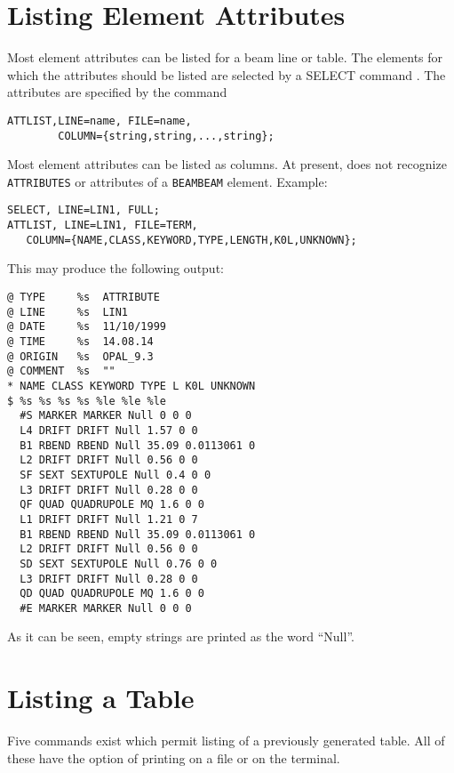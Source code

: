 \section{Listing Element Attributes}
\label{sec:attlist}
Most element attributes can be listed for a beam line or table.
The elements for which the attributes should be listed are selected
by a {SELECT} command .
The attributes are specified by the command
\begin{verbatim}
ATTLIST,LINE=name, FILE=name,
        COLUMN={string,string,...,string};
\end{verbatim}
Most element attributes can be listed as columns.
At present, \opal does not recognize \texttt{ATTRIBUTES} or attributes
of a \texttt{BEAMBEAM} element.
Example:
\begin{verbatim}
SELECT, LINE=LIN1, FULL;
ATTLIST, LINE=LIN1, FILE=TERM,
   COLUMN={NAME,CLASS,KEYWORD,TYPE,LENGTH,K0L,UNKNOWN};
\end{verbatim}
This may produce the following output:
\begin{verbatim}
@ TYPE     %s  ATTRIBUTE
@ LINE     %s  LIN1
@ DATE     %s  11/10/1999
@ TIME     %s  14.08.14
@ ORIGIN   %s  OPAL_9.3
@ COMMENT  %s  ""
* NAME CLASS KEYWORD TYPE L K0L UNKNOWN
$ %s %s %s %s %le %le %le
  #S MARKER MARKER Null 0 0 0
  L4 DRIFT DRIFT Null 1.57 0 0
  B1 RBEND RBEND Null 35.09 0.0113061 0
  L2 DRIFT DRIFT Null 0.56 0 0
  SF SEXT SEXTUPOLE Null 0.4 0 0
  L3 DRIFT DRIFT Null 0.28 0 0
  QF QUAD QUADRUPOLE MQ 1.6 0 0
  L1 DRIFT DRIFT Null 1.21 0 7
  B1 RBEND RBEND Null 35.09 0.0113061 0
  L2 DRIFT DRIFT Null 0.56 0 0
  SD SEXT SEXTUPOLE Null 0.76 0 0
  L3 DRIFT DRIFT Null 0.28 0 0
  QD QUAD QUADRUPOLE MQ 1.6 0 0
  #E MARKER MARKER Null 0 0 0
\end{verbatim}
As it can be seen, empty strings are printed as the word ``Null''.
\clearpage
\section{Listing a Table}
\label{sec:list}
Five commands exist which permit listing of a previously generated
table.
All of these have the option of printing on a file or on the terminal.


